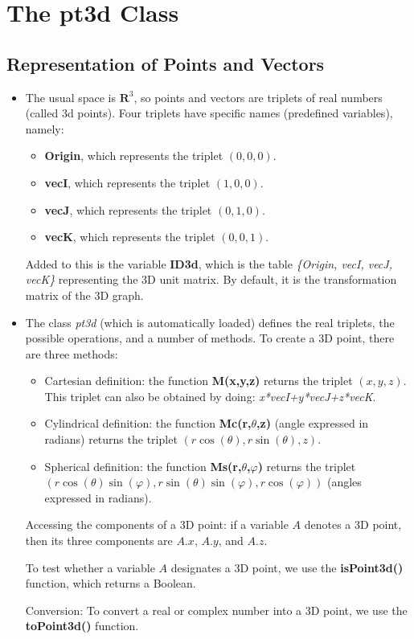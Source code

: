 \section{The pt3d Class}

\subsection{Representation of Points and Vectors}

\begin{itemize}
    \item The usual space is $\mathbf R^3$, so points and vectors are triplets of real numbers (called 3d points). Four triplets have specific names (predefined variables), namely:
\begin{itemize}
    \item \textbf{Origin}, which represents the triplet $(0,0,0)$.
    \item \textbf{vecI}, which represents the triplet $(1,0,0)$.
    \item \textbf{vecJ}, which represents the triplet $(0,1,0)$.
    \item \textbf{vecK}, which represents the triplet $(0,0,1)$.
\end{itemize}
Added to this is the variable \textbf{ID3d}, which is the table \emph{\{Origin, vecI, vecJ, vecK\}} representing the 3D unit matrix. By default, it is the transformation matrix of the 3D graph.
    \item The class \emph{pt3d} (which is automatically loaded) defines the real triplets, the possible operations, and a number of methods. To create a 3D point, there are three methods:
\begin{itemize}
    \item Cartesian definition: the function \textbf{M(x,y,z)} returns the triplet $(x,y,z)$. This triplet can also be obtained by doing: \emph{x*vecI+y*vecJ+z*vecK}.
    \item Cylindrical definition: the function \textbf{Mc(r,$\theta$,z)} (angle expressed in radians) returns the triplet $(r\cos(\theta),r\sin(\theta),z)$.
    \item Spherical definition: the function \textbf{Ms(r,$\theta$,$\varphi$)} returns the triplet $(r\cos(\theta)\sin(\varphi), r\sin(\theta)\sin(\varphi),r\cos(\varphi))$ (angles expressed in radians).
\end{itemize}
Accessing the components of a 3D point: if a variable $A$ denotes a 3D point, then its three components are $A.x$, $A.y$, and $A.z$.

To test whether a variable $A$ designates a 3D point, we use the \textbf{isPoint3d()} function, which returns a Boolean.

Conversion: To convert a real or complex number into a 3D point, we use the \textbf{toPoint3d()} function.

\end{itemize}


